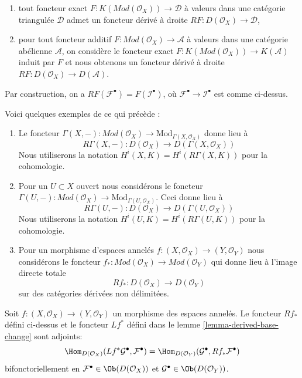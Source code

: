 \begin{enumerate}

\item tout foncteur exact $F : K(\textit{Mod}(\mathcal{O}_X)) \to \mathcal{D}$
à valeurs dans une catégorie triangulée $\mathcal{D}$ admet un foncteur dérivé à droite
$RF : D(\mathcal{O}_X) \to \mathcal{D}$,
\item pour tout foncteur additif
$F : \textit{Mod}(\mathcal{O}_X) \to \mathcal{A}$
à valeurs dans une catégorie abélienne $\mathcal{A}$, on considère le foncteur exact
$F : K(\textit{Mod}(\mathcal{O}_X)) \to K(\mathcal{A})$ induit par $F$
et nous obtenons un foncteur dérivé à droite
$RF : D(\mathcal{O}_X) \to D(\mathcal{A})$.

\end{enumerate}

Par construction, on a $RF(\mathcal{F}^\bullet) = F(\mathcal{I}^\bullet)$,
où $\mathcal{F}^\bullet \to \mathcal{I}^\bullet$ est comme ci-dessus.

\medskip\noindent
Voici quelques exemples de ce qui précède :
\begin{enumerate}
\item Le foncteur $\Gamma(X, -) : \textit{Mod}(\mathcal{O}_X) \to
\text{Mod}_{\Gamma(X, \mathcal{O}_X)}$ donne lieu à $$
R\Gamma(X, -) : D(\mathcal{O}_X) \to D(\Gamma(X, \mathcal{O}_X))
$$ Nous utiliserons la notation $H^i(X, K) = H^i(R\Gamma(X, K))$ pour la cohomologie.
\item Pour un $U \subset X$ ouvert nous considérons le foncteur $\Gamma(U, -) : \textit{Mod}(\mathcal{O}_X) \to
\text{Mod}_{\Gamma(U, \mathcal{O}_X)}$. Ceci donne lieu à $$
R\Gamma(U, -) : D(\mathcal{O}_X) \to D(\Gamma(U, \mathcal{O}_X))
$$ Nous utiliserons la notation $H^i(U, K) = H^i(R\Gamma(U, K))$ pour la cohomologie.
\item Pour un morphisme d'espaces annelés $f : (X, \mathcal{O}_X) \to (Y, \mathcal{O}_Y)$ nous considérons le foncteur $f_* : \textit{Mod}(\mathcal{O}_X) \to \textit{Mod}(\mathcal{O}_Y)$ qui donne lieu à l'image directe totale $$
Rf_* : D(\mathcal{O}_X) \longrightarrow D(\mathcal{O}_Y)
$$ sur des catégories dérivées non délimitées.
\end{enumerate}

\begin{lemma}

\label{lemma-adjoint}
Soit $f : (X, \mathcal{O}_X) \to (Y, \mathcal{O}_Y)$ un morphisme des espaces annelés. Le foncteur $Rf_*$ défini ci-dessus et le foncteur $Lf^*$ défini dans le lemme \ref{lemma-derived-base-change} sont adjoints: $$
\Hom_{D(\mathcal{O}_X)}(Lf^*\mathcal{G}^\bullet, \mathcal{F}^\bullet)
=
\Hom_{D(\mathcal{O}_Y)}(\mathcal{G}^\bullet, Rf_*\mathcal{F}^\bullet)
$$ bifonctoriellement en $\mathcal{F}^\bullet \in \Ob(D(\mathcal{O}_X))$ et $\mathcal{G}^\bullet \in \Ob(D(\mathcal{O}_Y))$.
\end{lemma}

